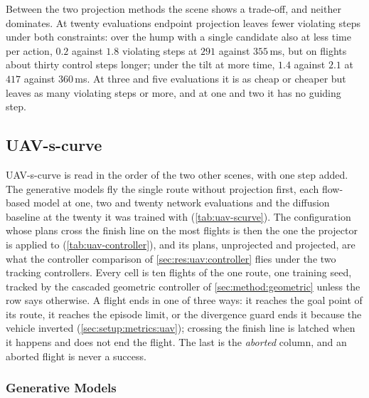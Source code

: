 Between the two projection methods the scene shows a trade-off, and neither dominates. At twenty evaluations
endpoint projection leaves fewer violating steps under both constraints: over the hump with a single
candidate also at less time per action, $0.2$ against $1.8$ violating steps at $291$ against $355$\,ms, but on
flights about thirty control steps longer; under the tilt at more time, $1.4$ against $2.1$ at $417$ against
$360$\,ms. At three and five evaluations it is as cheap or cheaper but leaves as many violating steps or more,
and at one and two it has no guiding step.

\FloatBarrier
\subsection{UAV-s-curve}\label{sec:res:uav:scurve}

UAV-s-curve is read in the order of the two other scenes, with one step added. The generative models
fly the single route without projection first, each flow-based model at one, two and twenty network
evaluations and the diffusion baseline at the twenty it was trained with (\autoref{tab:uav-scurve}). The
configuration whose plans cross the finish line on the most flights is then the one the projector is
applied to (\autoref{tab:uav-controller}), and its plans, unprojected and projected, are what the
controller comparison of \autoref{sec:res:uav:controller} flies under the two tracking controllers.
Every cell is ten flights of the one route, one training seed, tracked by the cascaded geometric
controller of \autoref{sec:method:geometric} unless the row says otherwise. A flight ends in one of
three ways: it reaches the goal point of its route, it reaches the episode limit, or the divergence guard
ends it because the vehicle inverted (\autoref{sec:setup:metrics:uav}); crossing the finish line is latched
when it happens and does not end the flight. The last is the \emph{aborted} column,
and an aborted flight is never a success.

\subsubsection{Generative Models}\label{sec:res:uav:scurve:models}

